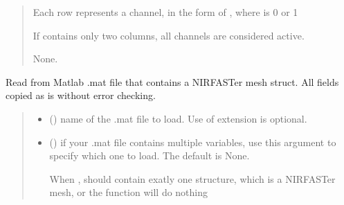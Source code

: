 \documentclass[letterpaper,10pt,english]{sphinxmanual}
\begin{document}
\begin{fulllineitems}
\begin{fulllineitems}
\begin{quote}
\begin{description}
\begin{itemize}
\sphinxAtStartPar
Each row represents a channel, in the form of , where  is 0 or 1

\sphinxAtStartPar
If  contains only two columns, all channels are considered active.


\end{itemize}

\sphinxAtStartPar
None.

\end{description}\end{quote}

\end{fulllineitems}


\begin{fulllineitems}
\label{\detokenize{_autosummary/nirfasterff.base.stnd_mesh.stndmesh:nirfasterff.base.stnd_mesh.stndmesh.from_mat}}
\pysigstartsignatures
\pysiglinewithargsret
{}
{\sphinxparamcomma {}}
{}
\pysigstopsignatures
\sphinxAtStartPar
Read from Matlab .mat file that contains a NIRFASTer mesh struct. All fields copied as is without error checking.
\begin{quote}\begin{description}
\begin{itemize}
\item {} 
\sphinxAtStartPar
{} () \textendash{} name of the .mat file to load. Use of extension is optional.

\item {} 
\sphinxAtStartPar
{} (\sphinxstyleliteralemphasis{\sphinxupquote{, }}) \textendash{} 
\sphinxAtStartPar
if your .mat file contains multiple variables, use this argument to specify which one to load. The default is None.

\sphinxAtStartPar
When ,  should contain exatly one structure, which is a NIRFASTer mesh, or the function will do nothing



\end{itemize}
\end{description}
\end{quote}
\end{fulllineitems}
\end{fulllineitems}
\end{document}
